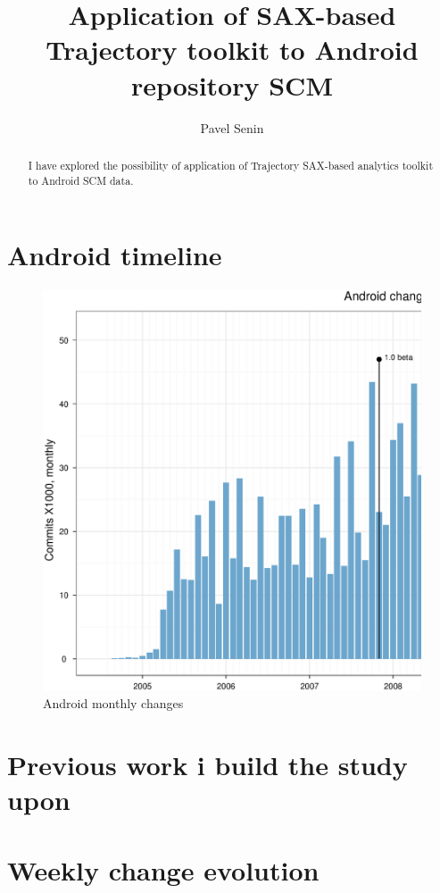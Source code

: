 \documentclass[a4paper,10pt]{report}
\title{Application of SAX-based Trajectory toolkit to Android repository SCM}
\author{Pavel Senin}
\begin{document}
\maketitle

\begin{abstract}
I have explored the possibility of application of Trajectory SAX-based analytics toolkit to Android SCM data.
\end{abstract}

\chapter{Android timeline}
\begin{figure}[!t]
\centering
\includegraphics[width=6.2in]{reportFigure00.ps}
\caption{Android monthly changes}
\label{fig_sim}
\end{figure}

\chapter{Previous work i build the study upon}

\chapter{Weekly change evolution}
\end{document}
